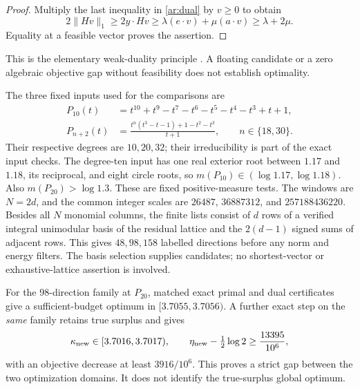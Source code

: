 \begin{proof}
Multiply the last inequality in \eqref{ar:dual} by $v\ge0$ to obtain
\[
 2\|Hv\|_1\ge2y\cdot Hv
 \ge\lambda(e\cdot v)+\mu(a\cdot v)\ge\lambda+2\mu.
\]
Equality at a feasible vector proves the assertion.
\end{proof}
This is the elementary weak-duality principle \cite[Section~5.1.3, equation~(5.2)]{BV04}.
A floating candidate or a zero algebraic objective gap without feasibility does not establish optimality.

The three fixed inputs used for the comparisons are
\begin{align*}
 P_{10}(t)&=t^{10}+t^9-t^7-t^6-t^5-t^4-t^3+t+1,\\
 P_{n+2}(t)&=\frac{t^n(t^3-t-1)+1-t^2-t^3}{t+1},
                         \qquad n\in\{18,30\}.
\end{align*}
Their respective degrees are $10,20,32$; their irreducibility is part of the exact input checks.
The degree-ten input has one real exterior root between $1.17$ and $1.18$, its reciprocal, and eight circle roots, so $m(P_{10})\in(\log1.17,\log1.18)$.
Also $m(P_{20})>\log1.3$.
These are fixed positive-measure tests.
The windows are $N=2d$, and the common integer scales are $26487$, $36887312$, and $257188436220$.
Besides all $N$ monomial columns, the finite lists consist of $d$ rows of a verified integral unimodular basis of the residual lattice and the $2(d-1)$ signed sums of adjacent rows.
This gives $48,98,158$ labelled directions before any norm and energy filters.
The basis selection supplies candidates; no shortest-vector or exhaustive-lattice assertion is involved.

\begin{proposition}\label{ar:true-surplus-gap}
For the $98$-direction family at $P_{20}$, matched exact primal and dual certificates give a sufficient-budget optimum in $[3.7055,3.7056)$.
A further exact step on the \emph{same} family retains true surplus and gives
\begin{equation}
 \kappa_{\rm new}\in[3.7016,3.7017),\qquad
 \eta_{\rm new}-\tfrac12\log2\ge\frac{13395}{10^6},
 \label{ar:true-surplus-improvement}
\end{equation}
with an objective decrease at least $3916/10^6$.
This proves a strict gap between the two optimization domains.
It does not identify the true-surplus global optimum.
\end{proposition}

